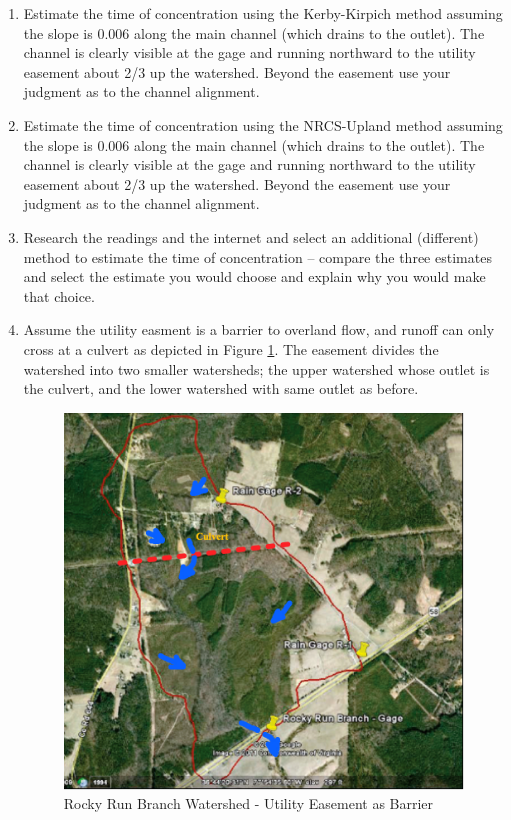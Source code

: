 \documentclass[12pt]{article}
\begin{document}
\begin{enumerate}
\item Estimate the time of concentration using the Kerby-Kirpich method assuming the slope is 0.006 along the main channel (which drains to the outlet).  The channel is clearly visible at the gage and running northward to the utility easement about 2/3 up the watershed.  Beyond the easement use your judgment as to the channel alignment. 
\item Estimate the time of concentration using the NRCS-Upland method assuming the slope is 0.006 along the main channel (which drains to the outlet).  The channel is clearly visible at the gage and running northward to the utility easement about 2/3 up the watershed.  Beyond the easement use your judgment as to the channel alignment. 
\item Research the readings and the internet and select an additional (different) method to estimate the time of concentration -- compare the three estimates and select the estimate you would choose and explain why you would make that choice.

\item Assume the utility easment is a barrier to overland flow, and runoff can only cross at a culvert as depicted in Figure \ref{fig:RockyRunSubDivide}. The easement divides the watershed into two smaller watersheds; the upper watershed whose outlet is the culvert, and the lower watershed with same outlet as before.

\begin{figure}[h!] %
   \centering
   \includegraphics[width=5.0in]{RockyRunSubDivide.jpg} 
   \caption{Rocky Run Branch Watershed - Utility Easement as Barrier}
   \label{fig:RockyRunSubDivide}
\end{figure}


\end{enumerate}
\end{document}
